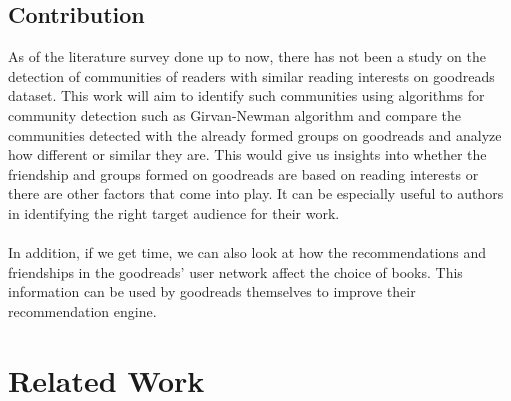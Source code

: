\documentclass[11pt]{article}
\begin{document}
\subsection{Contribution}
As of the literature survey done up to now, there has not been a study on the detection of communities of readers with similar reading interests on goodreads dataset.
This work will aim to identify such communities using algorithms for community detection such as Girvan-Newman algorithm and compare the communities detected with the already formed groups on goodreads and analyze how different or similar they are.
This would give us insights into whether the friendship and groups formed on goodreads are based on reading interests or there are other factors that come into play. It can be especially useful to authors in identifying the right target audience for their work. \\\\
In addition, if we get time, we can also look at how the recommendations and friendships in the goodreads' user network affect the choice of books. This information can be used by goodreads themselves to improve their recommendation engine.

\section{Related Work}
\end{document}
